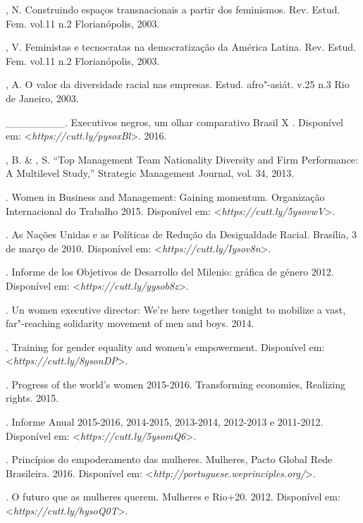 \begin{Parskip}
, N. Construindo espaços transnacionais a partir dos feminismos.
Rev. Estud. Fem. vol.11 n.2 Florianópolis, 2003.

, V. Feministas e tecnocratas na democratização da América
Latina. Rev. Estud. Fem. vol.11 n.2 Florianópolis, 2003.

, A. O valor da diversidade racial nas empresas. Estud. afro"-asiát.
v.25 n.3 Rio de Janeiro, 2003.

\_\_\_\_\_\_\_\_. Executivos negros, um olhar comparativo Brasil X .
Disponível em: \textless{}\emph{https://cutt.ly/pysoxBl}\textgreater{}.
2016.

, B. \& , S. ``Top Management Team Nationality Diversity
and Firm Performance: A Multilevel Study,'' Strategic Management
Journal, vol. 34, 2013.

. Women in Business and Management: Gaining momentum. Organização
Internacional do Trabalho 2015.
Disponível em: \textless{}\emph{https://cutt.ly/5ysovwV}\textgreater{}.

. As Nações Unidas e as Políticas de Redução da Desigualdade Racial.
Brasília, 3 de março de 2010.
Disponível em: \textless{}\emph{https://cutt.ly/Iysov8n}\textgreater{}.

. Informe de los Objetivos de Desarrollo del Milenio: gráfica
de género 2012.
Disponível em: \textless{}\emph{https://cutt.ly/yysob8z}\textgreater{}.

. Un women executive director: We're here together tonight to
mobilize a vast, far"-reaching solidarity movement of men and boys. 2014.

. Training for gender equality and women's empowerment.
Disponível em: \textless{}\emph{https://cutt.ly/8ysonDP}\textgreater{}.

. Progress of the world's women 2015-2016. Transforming
economies, Realizing rights. 2015.

. Informe Anual 2015-2016, 2014-2015, 2013-2014, 2012-2013 e
2011-2012. Disponível em: \textless{}\emph{https://cutt.ly/5ysomQ6}\textgreater{}.

. Princípios do empoderamento das mulheres.  Mulheres,
Pacto Global Rede Brasileira. 2016.
Disponível em: \textless{}\emph{http://portuguese.weprinciples.org/}\textgreater{}.

. O futuro que as mulheres querem.  Mulheres e Rio+20.
2012.
Disponível em: \textless{}\emph{https://cutt.ly/hysoQ0T}\textgreater{}.


\end{Parskip}
